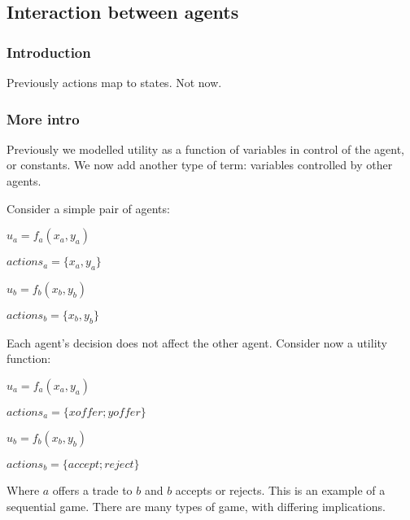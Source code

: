 
\subsection{Interaction between agents}

\subsubsection{Introduction}

Previously actions map to states. Not now.

\subsubsection{More intro}

Previously we modelled utility as a function of variables in control of the agent, or constants. We now add another type of term: variables controlled by other agents.

Consider a simple pair of agents:

\(u_a=f_a(x_a,y_a)\)

\({actions_a}=\{x_a,y_a\}\)

\(u_b=f_b(x_b,y_b)\)

\({actions_b}=\{x_b,y_b\}\)

Each agent’s decision does not affect the other agent. Consider now a utility function:

\(u_a=f_a(x_a,y_a)\)

\({actions_a}=\{{x offer}; {y offer}\}\)

\(u_b=f_b(x_b,y_b)\)

\({actions_b}=\{accept; reject\}\)

Where \(a\) offers a trade to \(b\) and \(b\) accepts or rejects. This is an example of a sequential game. There are many types of game, with differing implications.

